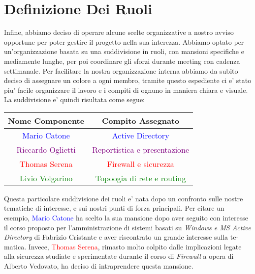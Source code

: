 \documentclass{report}
\begin{document}
		\section{Definizione Dei Ruoli}
			Infine, abbiamo deciso di operare alcune scelte organizzative a nostro avviso opportune per poter gestire il
			progetto nella sua interezza. Abbiamo optato per un'organizzazione basata su una suddivisione in ruoli, con
			mansioni specifiche e mediamente lunghe, per poi coordinare gli sforzi durante meeting con cadenza settimanale.
			Per facilitare la nostra organizzazione interna abbiamo da subito deciso di assegnare un colore a ogni membro,
			tramite questo espediente ci e' stato piu' facile organizzare il lavoro e i compiti di ognuno in maniera chiara
			e visuale. 
			La suddivisione e' quindi risultata come segue:
			\begin{center}
				\begin{tabular}{ |c|c| }
					\hline
					Nome Componente & Compito Assegnato \\
					\hline \hline
					\textcolor{Blue}{Mario Catone} & \textcolor{Blue}{Active Directory} \\
					\hline
					\textcolor{Purple}{Riccardo Oglietti} & \textcolor{Purple}{Reportistica e presentazione} \\
					\hline
					\textcolor{Red}{Thomas Serena} & \textcolor{Red}{Firewall e sicurezza} \\
					\hline
					\textcolor{Green}{Livio Volgarino} & \textcolor{Green}{Topoogia di rete e routing} \\
					\hline
				\end{tabular}
			\end{center}
			Questa particolare suddivisione dei ruoli e' nata dopo un confronto sulle nostre tematiche di interesse, e sui
			nostri punti di forza principali. Per citare un esempio, \textcolor{Blue}{Mario Catone} ha scelto la sua mansione
			dopo aver seguito con interesse il corso proposto per l'amministrazione di sistemi basati su \emph{Windows e MS
			Active Directory} di Fabrizio Cristante e aver riscontrato un grande interesse sulla te-\\matica. Invece,
			\textcolor{Red}{Thomas Serena}, rimasto molto colpito dalle implicazioni legate alla sicurezza studiate e
			sperimentate durante il corso di \emph{Firewall} a opera di Alberto Vedovato, ha deciso di intraprendere
			questa mansione.
\end{document}
